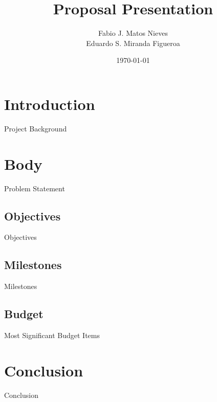 \documentclass[14pt, aspectratio=169]{beamer}
\title{Proposal Presentation}
\author{Fabio J. Matos Nieves\\Eduardo S. Miranda Figueroa}
\institute{Univerity of Puerto Rico Mayagüez Campus}
\date{\today}
\begin{document}
\maketitle
\begin{frame}
 \tableofcontents 
\end{frame}
\section{Introduction}
\begin{frame}{Project Background}
\end{frame}
\section{Body}
\begin{frame}{Problem Statement}
  
\end{frame}
\subsection{Objectives}
\begin{frame}{Objectives}
  
\end{frame}
\subsection{Milestones}
\begin{frame}{Milestones}
  
\end{frame}
\subsection{Budget}
\begin{frame}{Most Significant Budget Items}
  
\end{frame}
\section{Conclusion}
\begin{frame}{Conclusion}
  
\end{frame}
\end{document}
